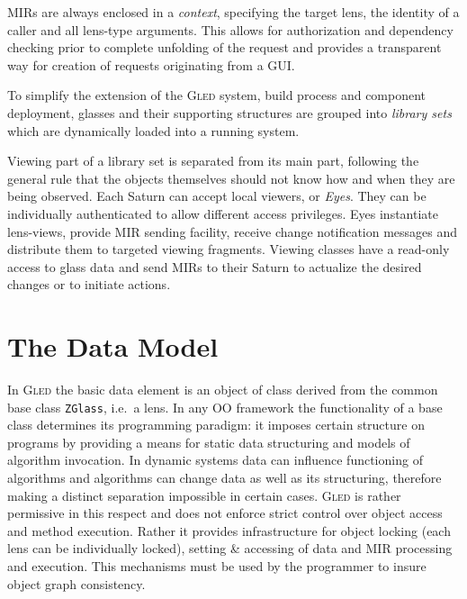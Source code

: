 \documentclass[final]{siamltex}
\def\gled{\textsc{Gled}\xspace}
\def\smalltt#1{{\small\texttt{#1}}}
\begin{document}
MIRs are always enclosed in a \emph{context}, specifying the target
lens, the identity of a caller and all lens-type arguments.
This allows for authorization and dependency checking prior to
complete unfolding of the request and provides a transparent
way for creation of requests originating from a GUI.

To simplify the extension of the \gled system, build process and
component deployment, glasses and their supporting structures are
grouped into \emph{library sets} which are dynamically loaded
into a running system.

Viewing part of a library set is separated from its main part,
following the general rule that the objects themselves should not know
how and when they are being observed. Each Saturn can accept local
viewers, or \emph{Eyes}. They can be individually authenticated to
allow different access privileges. Eyes instantiate lens-views,
provide MIR sending facility, receive change notification messages and
distribute them to targeted viewing fragments. Viewing classes have a
read-only access to glass data and send MIRs to their Saturn to
actualize the desired changes or to initiate actions.


\section{The Data Model}
\label{sec:DataModel}

In \gled the basic data element is an object of class derived from the
common base class \smalltt{ZGlass}, i.e.\ a lens. In any OO framework
the functionality of a base class determines its programming paradigm:
it imposes certain structure on programs by providing a means for
static data structuring and models of algorithm invocation. In dynamic
systems data can influence functioning of algorithms and algorithms
can change data as well as its structuring, therefore making a
distinct separation impossible in certain cases.  \gled is rather
permissive in this respect and does not enforce strict control over
object access and method execution. Rather it provides infrastructure
for object locking (each lens can be individually locked), setting \&
accessing of data and MIR processing and execution. This mechanisms
must be used by the programmer to insure object graph consistency.
\end{document}

